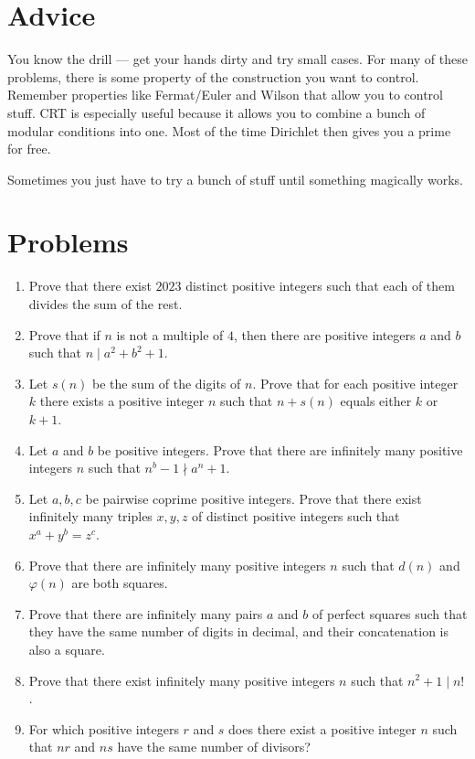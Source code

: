 \documentclass{article}
\begin{document}
\section{Advice}
You know the drill --- get your hands dirty and try small cases. For many of
these problems, there is some property of the construction you want to control.
Remember properties like Fermat/Euler and Wilson that allow you to control stuff.
CRT is especially useful because it allows
you to combine a bunch of modular conditions into one. Most of the time
Dirichlet then gives you a prime for free.

Sometimes you just have to try a bunch of stuff until something magically works.
\section{Problems}
\begin{enumerate}
  \item Prove that there exist $2023$ distinct positive integers such that each of them
    divides the sum of the rest.
  \item Prove that if $n$ is not a multiple of $4$, then there are positive
    integers $a$ and $b$ such that $n\mid a^2+b^2+1$.
  \item Let $s(n)$ be the sum of the digits of $n$. Prove that for each positive
    integer $k$ there exists a positive integer $n$ such that $n+s(n)$ equals
    either $k$ or $k+1$.
  \item Let $a$ and $b$ be positive integers. Prove that there are infinitely
    many positive integers $n$ such that $n^b-1\nmid a^n+1$.
  \item Let $a,b,c$ be pairwise coprime positive integers. Prove that there
    exist infinitely many triples $x,y,z$ of distinct positive integers such
    that $x^a+y^b=z^c$.
  \item Prove that there are infinitely many positive integers $n$ such that
    $d(n)$ and $\varphi(n)$ are both squares.
  \item Prove that there are infinitely many pairs $a$ and $b$ of perfect
    squares such that they have the same number of digits in decimal, and their
    concatenation is also a square.
  \item Prove that there exist infinitely many positive integers $n$ such that
    $n^2+1\mid n!$.
  \item For which positive integers $r$ and $s$ does there exist a positive
    integer $n$ such that $nr$ and $ns$ have the same number of divisors?
\end{enumerate}
\newpage
\end{document}
